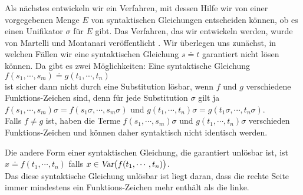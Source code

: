 Als nächstes entwickeln wir ein Verfahren, mit dessen Hilfe wir von einer vorgegebenen
Menge $E$ von syntaktischen Gleichungen entscheiden können, ob es einen Unifikator $\sigma$ für $E$
gibt.  Das Verfahren, das wir entwickeln werden, wurde von Martelli und Montanari veröffentlicht \cite{martelli:1982}. 
Wir überlegen uns zunächst, in welchen Fällen wir eine syntaktischen Gleichung $s \doteq t$
garantiert nicht lösen können.  Da gibt es zwei Möglichkeiten: Eine syntaktische Gleichung  \\[0.2cm]
\hspace*{1.3cm} $f(s_1,\cdots,s_m) \doteq g(t_1,\cdots, t_n)$ \\[0.2cm]
ist sicher dann nicht durch eine Substitution lösbar, wenn $f$ und $g$ verschiedene
Funktions-Zeichen sind, denn für jede Substitution $\sigma$ gilt ja \\[0.2cm]
\hspace*{1.0cm} $f(s_1,\cdots,s_m)\sigma = f(s_1\sigma,\cdots,s_m\sigma)$ \quad und \quad
                $g(t_1,\cdots, t_n)\sigma = g(t_1\sigma,\cdots,t_n\sigma)$. \\[0.2cm]
Falls $f \not = g$ ist, haben die Terme  $f(s_1,\cdots,s_m)\sigma$ und $g(t_1,\cdots, t_n)\sigma$ verschieden
Funktions-Zeichen und können daher syntaktisch nicht identisch werden.

Die andere Form einer syntaktischen Gleichung, die garantiert unlösbar ist, ist\\[0.2cm]
\hspace*{1.3cm} $x \doteq f(t_1,\cdots,t_n)$  \quad falls $x \in \textsl{Var}\big(f(t_1,\cdots,t_n)\big)$. \\[0.2cm]
Das diese syntaktische Gleichung unlösbar ist liegt daran, dass die rechte Seite immer mindestens ein
Funktions-Zeichen mehr enthält als die linke.  

